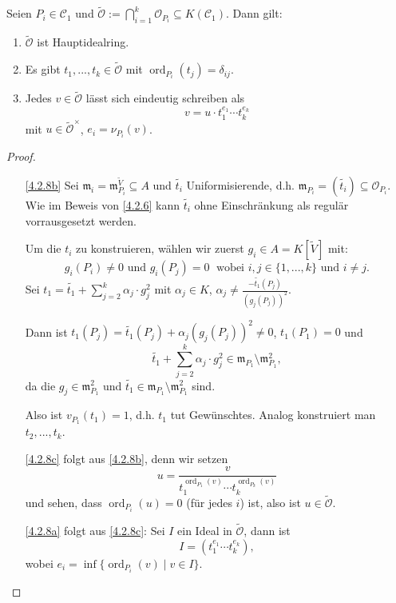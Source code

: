 \documentclass[a4paper,12pt,index=toc]{scrbook}
\theoremstyle{keinenummern} %
\def\CC{\mathcal{C}}
\def\O{\mathcal{O}}
\def\m{\mathfrak{m}}
\newcommand{\ord}{\operatorname{ord}}
\renewcommand{\dotsc}{\ensuremath{\!...}}
\newcommand{\schlange}[1]{\widetilde{#1}}
\begin{document}
\begin{lem}\label{4.2.8} Seien $P_{i}\in\CC_{1}$ und $\schlange{\O}:=\displaystyle \bigcap_{i=1}^{k} \O_{P_i} \subseteq K(\CC_1)$. Dann gilt:
  \begin{enumerate}
  \item{} $\schlange{\O}$ ist Hauptidealring.
  \item{} Es gibt $t_1,\dotsc,t_k \in \schlange{\O}$ mit $\ord_{P_i} (t_j)=\delta_{ij}$.
  \item{} Jedes $v\in \schlange{\O}$ lässt sich eindeutig schreiben als \begin{equation*}v=u\cdot t_1^{e_1}\dotsm t_k^{e_k}\end{equation*} mit $u\in \schlange{\O}^{\times}$, $e_i=\nu_{P_i} (v)$.
  \end{enumerate}
\end{lem}
\begin{proof} \begin{enumerate}
  \item[\ref{4.2.8b}] Sei $\m_i=\m_{P_i}^{\schlange{V}}\subseteq A$ und $\schlange{t_i}$ Uniformisierende, d.h. $\m_{P_i}=(\schlange{t_i})\subseteq \O_{P_i}$.
Wie im Beweis von \cref{4.2.6} kann $\schlange{t_i}$ ohne Einschränkung als regulär vorrausgesetzt werden.

Um die $t_i$ zu konstruieren, wählen wir zuerst $g_i\in A=K[\schlange{V}]$ mit: 
\begin{equation*}g_i(P_i)\neq 0 \text{ und } g_i(P_j)=0\; \text{ wobei }i,j\in \{1,\dotsc,k\}\text{ und }i\neq j.\end{equation*} 
Sei $t_1=\schlange{t_1}+\displaystyle \sum_{j=2}^{k} \alpha_j \cdot g_j^2$ mit $\alpha_j \in K$, $\displaystyle\alpha_j \neq \frac
{-\schlange{t_1}(P_j)}{(g_j(P_j))^2}$.

Dann ist $t_1(P_j)=\schlange{t_1}(P_j)+\alpha_j(g_j(P_j))^2\neq 0$, $t_1(P_1)=0$ und 
\begin{equation*}\schlange{t_1}+\displaystyle \sum_{j=2}^{k} \alpha_j \cdot g_j^2 \in \m_{P_1} \setminus \m_{P_1}^2,\end{equation*}
 da die $g_j\in \m_{P_1}^2$ und $\schlange{t_1} \in \m_{P_1}\setminus \m_{P_1}^2$ sind. 

Also ist $v_{P_1}(t_1)=1$, d.h. $t_1$ tut Gewünschtes. Analog konstruiert man $t_2,\dotsc,t_k$.
  \item[\ref{4.2.8c}] folgt aus \ref{4.2.8b}, denn wir setzen 
  \begin{equation*}u=\frac{v}{t_1^{\ord_{P_1}(v)}\dotsm t_k^{\ord_{P_k}(v)}}\end{equation*} und sehen, dass $\ord_{P_i}(u)=0$ (für jedes $i$) ist, also ist $u\in \schlange{\O}$.
  \item[\ref{4.2.8a}] folgt aus \ref{4.2.8c}: Sei $I$ ein Ideal in $\schlange{\O}$, dann ist \begin{equation*}I=(t_1^{e_1}\dotsm t_k^{e_k}),\end{equation*} wobei $e_i=\inf\{\ord_{P_i} (v) \mid v\in I\}$.
\end{enumerate}
\end{proof}
\end{document}
